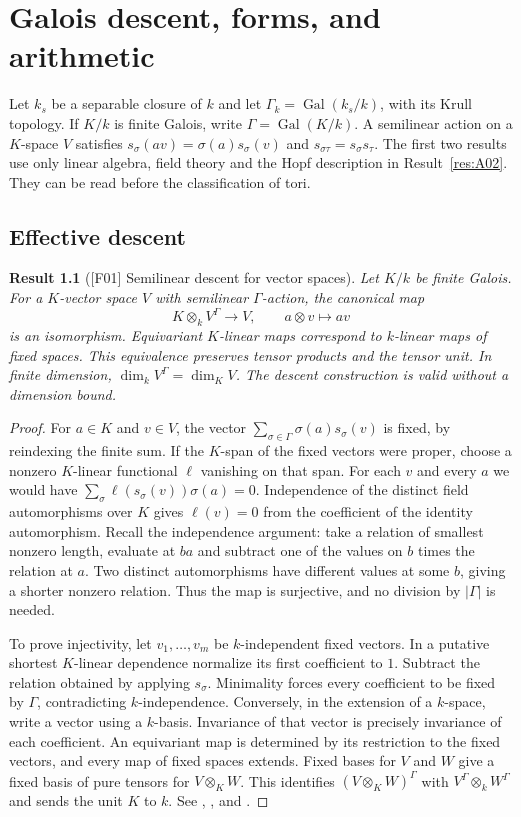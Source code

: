 \documentclass[11pt,a4paper,openany,oneside]{book}
\theoremstyle{resultstyle}
\newtheorem{statement}{Result}[chapter]
\newenvironment{result}[2]{\clubpenalty=10000\begin{statement}[\textnormal{[#1]} #2]\leavevmode\label{res:#1}\ignorespaces}{\end{statement}}
\theoremstyle{definition}
\numberwithin{equation}{chapter}
\DeclareMathOperator{\Gal}{Gal}
\begin{document}
\chapter{Galois descent, forms, and arithmetic}
\label{ch:descent}

Let $k_s$ be a separable closure of $k$ and let $\Gamma_k=\Gal(k_s/k)$, with its Krull topology. If $K/k$ is finite Galois, write $\Gamma=\Gal(K/k)$. A semilinear action on a $K$-space $V$ satisfies $s_\sigma(av)=\sigma(a)s_\sigma(v)$ and $s_{\sigma\tau}=s_\sigma s_\tau$. The first two results use only linear algebra, field theory and the Hopf description in Result~\ref{res:A02}. They can be read before the classification of tori.

\section{Effective descent}

\begin{result}{F01}{Semilinear descent for vector spaces}
Let $K/k$ be finite Galois. For a $K$-vector space $V$ with semilinear $\Gamma$-action, the canonical map
\[
 K\otimes_k V^\Gamma\longrightarrow V,\qquad a\otimes v\longmapsto av
\]
is an isomorphism. Equivariant $K$-linear maps correspond to $k$-linear maps of fixed spaces. This equivalence preserves tensor products and the tensor unit. In finite dimension, $\dim_k V^\Gamma=\dim_K V$. The descent construction is valid without a dimension bound.
\end{result}
\begin{proof}
For $a\in K$ and $v\in V$, the vector $\sum_{\sigma\in\Gamma}\sigma(a)s_\sigma(v)$ is fixed, by reindexing the finite sum. If the $K$-span of the fixed vectors were proper, choose a nonzero $K$-linear functional $\ell$ vanishing on that span. For each $v$ and every $a$ we would have
$\sum_\sigma \ell(s_\sigma(v))\sigma(a)=0$. Independence of the distinct field automorphisms over $K$ gives $\ell(v)=0$ from the coefficient of the identity automorphism. Recall the independence argument: take a relation of smallest nonzero length, evaluate at $ba$ and subtract one of the values on $b$ times the relation at $a$. Two distinct automorphisms have different values at some $b$, giving a shorter nonzero relation. Thus the map is surjective, and no division by $|\Gamma|$ is needed.

To prove injectivity, let $v_1,\dots,v_m$ be $k$-independent fixed vectors. In a putative shortest $K$-linear dependence normalize its first coefficient to $1$. Subtract the relation obtained by applying $s_\sigma$. Minimality forces every coefficient to be fixed by $\Gamma$, contradicting $k$-independence. Conversely, in the extension of a $k$-space, write a vector using a $k$-basis. Invariance of that vector is precisely invariance of each coefficient. An equivariant map is determined by its restriction to the fixed vectors, and every map of fixed spaces extends. Fixed bases for $V$ and $W$ give a fixed basis of pure tensors for $V\otimes_K W$. This identifies $(V\otimes_K W)^\Gamma$ with $V^\Gamma\otimes_k W^\Gamma$ and sends the unit $K$ to $k$. See \cite[Lemma 2.3.8]{gs}, \cite[Proposition 3.36]{milne}, and \cite[Tag 0CDR]{stacks}.
\end{proof}
\end{document}

